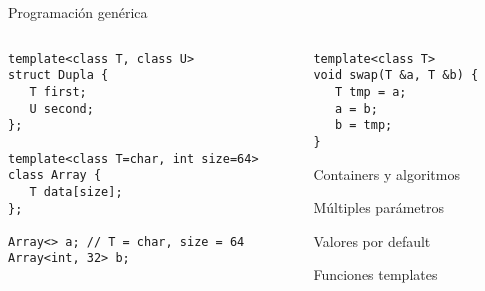 \begin{frame}[fragile]{Programaci\'on gen\'erica}
   \begin{columns}
      \begin{column}{.58\linewidth}
         \begin{lstlisting}[style=normalnonumbers,linebackgroundcolor={%
         \only<1,4>{\def\lst@linebgrdcmd####1####2####3{}}%
         \btLstHLB<2>{1,3-4}% uso de T y U
         \btLstHLB<3>{7,9}% uso de int y default
   }]
template<class T, class U>
struct Dupla {
   T first;
   U second;
};

template<class T=char, int size=64>
class Array {
   T data[size];
};

Array<> a; // T = char, size = 64
Array<int, 32> b;

         \end{lstlisting}
      \end{column}
      \begin{column}{.4\linewidth}
         \begin{lstlisting}[style=normalnonumbers,linebackgroundcolor={%
         \only<1-3>{\def\lst@linebgrdcmd####1####2####3{}}%
         \btLstHLB<4>{1,2}% uso funciones templates
   }]
template<class T>
void swap(T &a, T &b) {
   T tmp = a;
   a = b;
   b = tmp;
}
         \end{lstlisting}
         \begin{itemize}
             {
            \item Containers y algoritmos 
                }
             {
            \item M\'ultiples par\'ametros
                }
             {
                \item Valores por default
                }
             {
                \item Funciones templates
                }
         \end{itemize}
      \end{column}
   \end{columns}
\end{frame}


